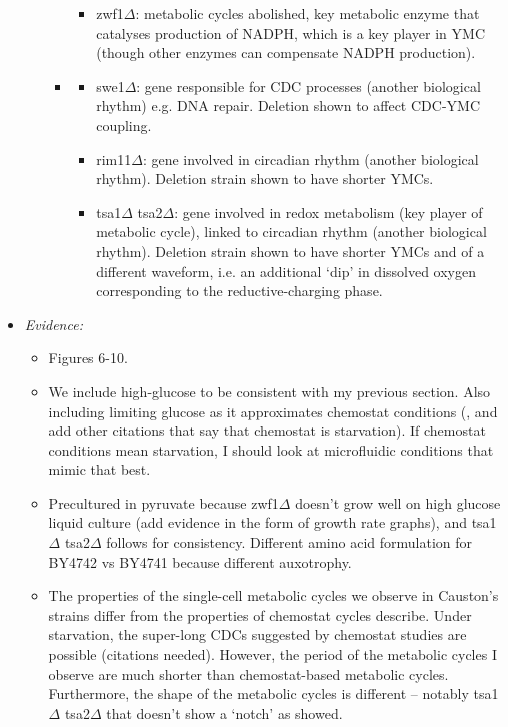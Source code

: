 \begin{itemize}
\begin{itemize}
\begin{itemize}
\begin{itemize}
\item zwf1$\Delta$: metabolic cycles abolished, key metabolic enzyme that catalyses production of NADPH, which is a key player in YMC (though other enzymes can compensate NADPH production).
\end{itemize}
\item \textcite{caustonMetabolicCyclesYeast2015}
\begin{itemize}
\item swe1$\Delta$: gene responsible for CDC processes (another biological rhythm) e.g. DNA repair.  Deletion shown to affect CDC-YMC coupling.
\item rim11$\Delta$: gene involved in circadian rhythm (another biological rhythm).  Deletion strain shown to have shorter YMCs.
\item tsa1$\Delta$ tsa2$\Delta$: gene involved in redox metabolism (key player of metabolic cycle), linked to circadian rhythm (another biological rhythm).  Deletion strain shown to have shorter YMCs and of a different waveform, i.e. an additional `dip' in dissolved oxygen corresponding to the reductive-charging phase.
\end{itemize}
\end{itemize}
\end{itemize}
\item \emph{Evidence:}
\begin{itemize}
\item Figures 6-10.
\item We include high-glucose to be consistent with my previous section.  Also including limiting glucose as it approximates chemostat conditions (\textcite{jonesCyberneticModelGrowth1999}, and add other citations that say that chemostat is starvation).  If chemostat conditions mean starvation, I should look at microfluidic conditions that mimic that best.
\item Precultured in pyruvate because zwf1$\Delta$ doesn't grow well on high glucose liquid culture (add evidence in the form of growth rate graphs), and tsa1$\Delta$ tsa2$\Delta$ follows for consistency.  Different amino acid formulation for BY4742 vs BY4741 because different auxotrophy.
\item The properties of the single-cell metabolic cycles we observe in Causton's strains differ from the properties of chemostat cycles \textcite{caustonMetabolicCyclesYeast2015} describe.  Under starvation, the super-long CDCs suggested by chemostat studies are possible (citations needed).  However, the period of the metabolic cycles I observe are much shorter than chemostat-based metabolic cycles.  Furthermore, the shape of the metabolic cycles is different -- notably tsa1$\Delta$ tsa2$\Delta$ that doesn't show a `notch' as \textcite{caustonMetabolicCyclesYeast2015} showed.
\end{itemize}


\end{itemize}
